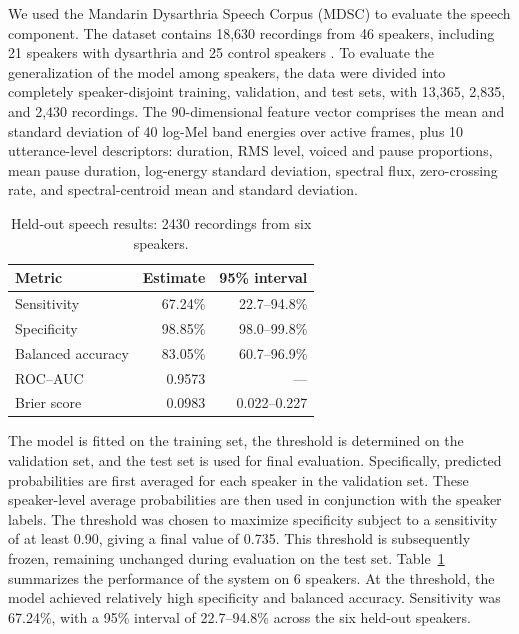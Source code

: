 \documentclass[conference]{IEEEtran}
\providecommand{\revisioncolor}{black}
\DeclareRobustCommand{\revised}[1]{{\color{\revisioncolor}#1}}
\begin{document}
We used the Mandarin Dysarthria Speech Corpus (MDSC) to evaluate the speech component. The dataset contains 18,630 recordings from 46 speakers, including 21 speakers with dysarthria and 25 control speakers \cite{b10}. To evaluate the generalization of the model among speakers, the data were divided into completely speaker-disjoint training, validation, and test sets, with 13,365, 2,835, and 2,430 recordings.
The 90-dimensional feature vector comprises the mean and standard deviation of 40 log-Mel band energies over active frames, plus 10 utterance-level descriptors: duration, RMS level, voiced and pause proportions, mean pause duration, log-energy standard deviation, spectral flux, zero-crossing rate, and spectral-centroid mean and standard deviation.

\begin{table}[htbp]
\centering\footnotesize
\caption{Held-out speech results: 2430 recordings from six speakers.}
\label{tab:model_performance}
\begin{tabular}{|l|r|r|}\hline
\textbf{Metric} & \textbf{Estimate} & \textbf{95\% interval} \\\hline
Sensitivity & 67.24\% & 22.7--94.8\% \\
Specificity & 98.85\% & 98.0--99.8\% \\
Balanced accuracy & 83.05\% & 60.7--96.9\% \\
ROC--AUC & 0.9573 & --- \\
Brier score & 0.0983 & 0.022--0.227 \\
\hline\end{tabular}
\end{table}
The model is fitted on the training set, the threshold is determined on the validation set, and the test set is used for final evaluation. Specifically, predicted probabilities are first averaged for each speaker in the validation set. These speaker-level average probabilities are then used in conjunction with the speaker labels. The threshold was chosen to maximize specificity subject to a sensitivity of at least 0.90, giving a final value of 0.735. This threshold is subsequently frozen, remaining unchanged during evaluation on the test set. Table~\ref{tab:model_performance} summarizes the performance of the system on 6 speakers. At the threshold, the model achieved relatively high specificity and balanced accuracy. \revised{Sensitivity was 67.24\%, with a 95\% interval of 22.7--94.8\% across the six held-out speakers.}

\end{document}
